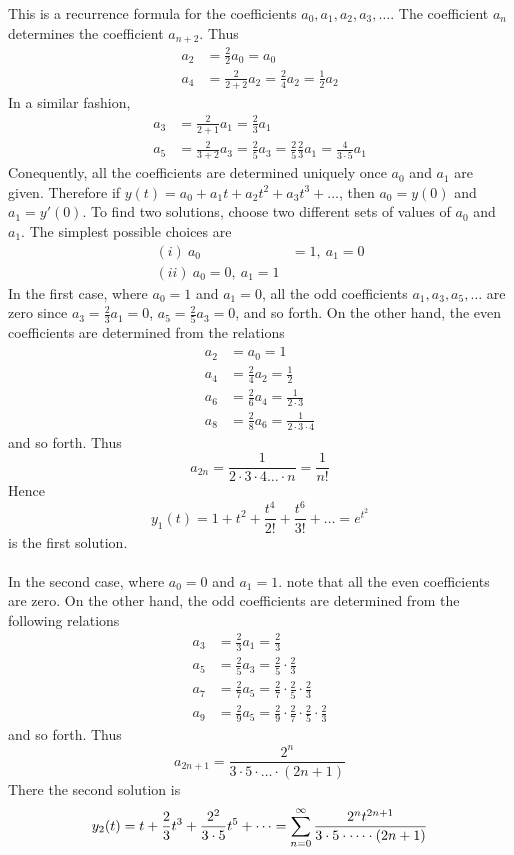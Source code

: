\documentclass[12pt]{article}
\begin{document}
\begin{example}
This is a recurrence formula for the coefficients $a_0, a_1, a_2, a_3, \dots$. The coefficient $a_n$ determines the coefficient $a_{n + 2}$. Thus $$\begin{aligned} a_2 &= \frac{2}{2}a_0  = a_0 \\ a_4 &= \frac{2}{2 + 2}a_2 = \frac{2}{4}a_2 = \frac{1}{2}a_2 \end{aligned} $$ In a similar fashion, $$\begin{aligned} a_3 &= \frac{2}{2 + 1}a_1 = \frac{2}{3}a_1 \\ a_5 &= \frac{2}{3 + 2}a_3 = \frac{2}{5} a_3 = \frac{2}{5} \frac{2}{3}a_1 = \frac{4}{3 \cdot 5}a_1 \end{aligned} $$ 
Conequently, all the coefficients are determined uniquely once $a_0$ and $a_1$ are given. Therefore if $y(t) = a_0 + a_1t + a_2t^2 + a_3t^3 + \dots$, then $a_0 = y(0)$ and $a_1 = y'(0)$. To find two solutions, choose two different sets of values of $a_0$ and $a_1$. The simplest possible choices are $$\begin{aligned} (i) ~ a_0 &= 1, ~ a_1 = 0 \\ (ii) ~ a_0 = 0, ~ a_1 = 1 \end{aligned} $$ In the first case, where $a_0 = 1$ and $a_1 = 0$, all the odd coefficients $a_1, a_3, a_5, \dots$ are zero since $a_3 = \frac{2}{3}a_1 = 0$, $a_5 = \frac{2}{5}a_3 = 0$, and so forth. On the other hand, the even coefficients are determined from the relations $$\begin{aligned} a_2 &= a_0 = 1 \\ a_4 &= \frac{2}{4}a_2 = \frac{1}{2} \\ a_6 &= \frac{2}{6}a_4 = \frac{1}{2 \cdot 3} \\ a_8 &= \frac{2}{8}a_6 = \frac{1}{2 \cdot 3 \cdot 4} \end{aligned} $$ and so forth. Thus $$a_{2n} = \frac{1}{2 \cdot 3 \cdot 4 \dots \cdot n} = \frac{1}{n!} $$ Hence $$y_1(t) = 1 + t^2 + \frac{t^4}{2!} + \frac{t^6}{3!} + \dots = e^{t^2} $$ is the first solution. \\~\\ In the second case, where $a_0 = 0$ and $a_1 = 1$. note that all the even coefficients are zero. On the other hand, the odd coefficients are determined from the following relations $$\begin{aligned} a_3 &= \frac{2}{3}a_1 = \frac{2}{3} \\ a_5 &= \frac{2}{5}a_3 = \frac{2}{5} \cdot \frac{2}{3} \\ a_7 &= \frac{2}{7}a_5 = \frac{2}{7} \cdot \frac{2}{5} \cdot \frac{2}{3} \\ a_9 &= \frac{2}{9}a_5 = \frac{2}{9} \cdot \frac{2}{7} \cdot \frac{2}{5} \cdot \frac{2}{3} \end{aligned} $$ and so forth. Thus $$a_{2n + 1} = \frac{2^n}{3 \cdot 5 \cdot \dots \cdot (2n + 1)} $$ There the second solution is $$y_2(t) = t + \frac{2}{3}t^3 + \frac{2^2}{3 \cdot 5}t^5 + \dots = \sum_{n = 0}^{\infty} \frac{2^nt^{2n + 1}}{3 \cdot 5 \cdot \dots \cdot (2n + 1)} $$ \end{example}
\end{document}
